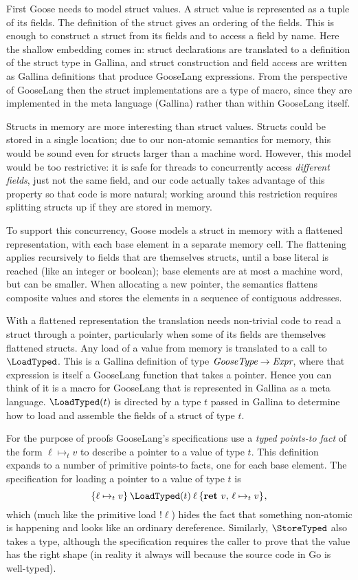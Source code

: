 First Goose needs to model struct values. A struct value is represented as a tuple
of its fields. The definition of the struct gives an ordering of the fields.
This is enough to construct a struct from its fields and to access a field by
name. Here the shallow embedding comes in: struct declarations are translated to
a definition of the struct type in
Gallina, and struct construction and field access are written as Gallina definitions that
produce GooseLang expressions. From the perspective of GooseLang then the struct
implementations are a type of macro, since they are implemented in the meta
language (Gallina) rather than within GooseLang itself.

Structs in memory are more interesting than struct values. Structs could
be stored in a single location; due to our non-atomic semantics for
memory, this would be sound even for structs larger than a machine word.
However, this model would be too restrictive: it is safe for threads to
concurrently access \emph{different fields}, just not the same field,
and our code actually takes advantage of this property so that code is more
natural; working around this restriction requires splitting structs up if they
are stored in memory.

To support this concurrency, Goose models a struct in memory with a
flattened representation, with each base element in a separate memory
cell. The flattening applies recursively to fields that are themselves
structs, until a base literal is reached (like an integer or boolean);
base elements are at most a machine word, but can be smaller. When
allocating a new pointer, the semantics flattens composite values and
stores the elements in a sequence of contiguous addresses.

With a flattened representation the translation needs non-trivial code to read a struct
through a pointer, particularly when some of its fields are themselves flattened
structs. Any load of a value from memory is translated to a call to
$\LoadTyped$. This is a Gallina definition of type
$\textit{GooseType} \to \textit{Expr}$, where that expression is itself a
GooseLang function that takes a pointer. Hence you can think of it is a macro
for GooseLang that is represented in Gallina as a meta language. $\LoadTyped(t)$
is directed by a type $t$ passed in Gallina to determine how to load and
assemble the fields of a struct of type $t$.

For the purpose of proofs GooseLang's specifications use a \emph{typed points-to fact}
of the form $\ell \mapsto_t v$ to describe a pointer to a value of type $t$. This
definition expands to a number of primitive points-to facts, one for
each base element. The specification for loading a pointer to a value of type
$t$ is
\[
\hoare{\ell \mapsto_t v}{\LoadTyped(t) \app \ell}{\Ret{v} \ell \mapsto_t v},
\] which
(much like the primitive load $!\ell$) hides the fact that something
non-atomic is happening and looks like an ordinary dereference.
Similarly, $\StoreTyped$ also takes a type, although the specification
requires the caller to prove that the value has the right shape (in
reality it always will because the source code in Go is well-typed).

